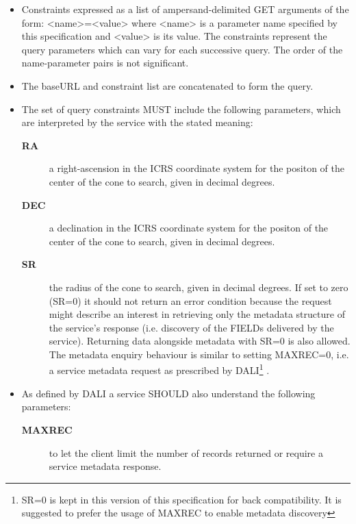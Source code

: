 \documentclass[11pt,a4paper]{ivoa}
\begin{document}
\begin{itemize}
		\item Constraints expressed as a list of
			ampersand-delimited GET arguments of the form: <name>=<value> where
			<name> is a parameter name specified by this specification and <value>
			is its value. The constraints represent the query parameters which can
			vary for each successive query. The order of the name-parameter pairs is
			not significant.
		\item The baseURL and constraint list are concatenated
			to form the query. 
		\item The set of query constraints MUST include the
			following parameters, which are interpreted by the service with the
			stated meaning: 
			\begin{description}
				\item[\textbf{RA}] a right-ascension
					in the ICRS coordinate system for the positon of the center of the cone
					to search, given in decimal degrees.
				\item[\textbf{DEC}] a declination
					in the ICRS coordinate system for the positon of the center of the cone
					to search, given in decimal degrees.
				\item[\textbf{SR}] the radius of the cone to search, given in decimal degrees.
					If set to zero (SR=0) it should not return an error condition because the
					request might describe an interest in retrieving only the metadata structure
					of the service's response (i.e. discovery of the FIELDs delivered by the service).
					Returning data alongside metadata with SR=0 is also allowed.
					The metadata enquiry behaviour is similar to setting MAXREC=0, i.e. a service
					metadata request as prescribed 	by DALI\footnote{SR=0 is kept in this version 
					of this specification for back compatibility. It is suggested to prefer the
					usage of MAXREC to enable metadata discovery} \citep{2017ivoa.spec.0517D}.
			\end{description}
		\item As defined by DALI a service SHOULD also understand the following parameters:
			\begin{description}
				\item[\textbf{MAXREC}] to let the client limit the number of records returned
					or require a service metadata response.

\end{description}
\end{itemize}
\end{document}
